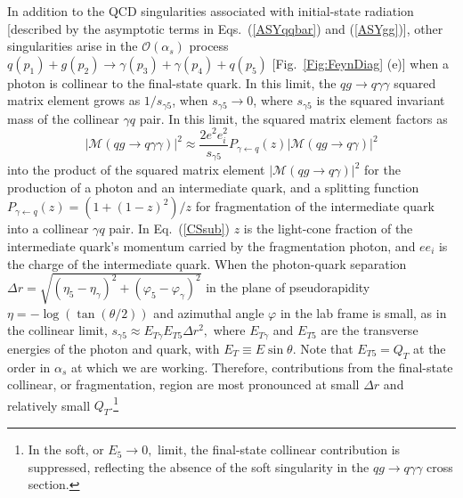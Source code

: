 \documentclass[12pt,english,aps,preprint,prd,letterpaper,fleqn,nofootinbib,showpacs,showkeys,tightenlines,floatfix]{revtex4}
\begin{document}
In addition to the QCD singularities associated with initial-state
radiation {[}described by the asymptotic terms in Eqs.~(\ref{ASYqqbar})
and (\ref{ASYgg})], other singularities arise in the ${\mathcal{O}}(\alpha_{s})$
process $q(p_{1})+g(p_{2})\rightarrow\gamma(p_{3})+\gamma(p_{4})+q(p_{5})$
{[}Fig.~\ref{Fig:FeynDiag} (e)] when a photon is collinear to the
final-state quark. In this limit, the $qg\rightarrow q\gamma\gamma$
squared matrix element grows as $1/s_{\gamma5}$, when $s_{\gamma5} \rightarrow 0$, 
where $s_{\gamma5}$ is the squared invariant mass of the collinear $\gamma q$
pair. In this limit, the squared matrix element factors as \begin{equation}
|{\mathcal{M}}(qg\rightarrow q\gamma\gamma)|^{2}\approx{\frac{2e^{2}e_{i}^{2}}{s_{\gamma5}}}P_{\gamma\leftarrow q}({z})|{\mathcal{M}}(qg\rightarrow q\gamma)|^{2}\label{CSsub}\end{equation}
 into the product of the squared matrix element $\left|{\mathcal{M}}(qg\rightarrow q\gamma)\right|^{2}$
for the production of a photon and an intermediate quark, and a splitting
function $P_{\gamma\leftarrow q}(z)=(1+(1-z)^{2})/z$ for fragmentation
of the intermediate quark into a collinear $\gamma q$ pair. In Eq.~(\ref{CSsub})
$z$ is the light-cone fraction of the intermediate quark's momentum
carried by the fragmentation photon, and $ee_{i}$ is the charge of
the intermediate quark. When the photon-quark separation $\Delta r=\sqrt{(\eta_{5}-\eta_{\gamma})^{2}+(\varphi_{5}-\varphi_{\gamma})^{2}}$
in the plane of pseudorapidity $\eta=-\log(\tan(\theta/2))$ and azimuthal
angle $\varphi$ in the lab frame is small, as in the collinear limit,
$s_{\gamma5}\approx E_{T\gamma}E_{T5}\Delta r^{2},$ where $E_{T\gamma}$
and $E_{T5}$ are the transverse energies of the photon and quark,
with $E_{T}\equiv E\sin\theta$. Note that $E_{T5}=Q_{T}$ at the
order in $\alpha_{s}$ at which we are working. Therefore, contributions
from the final-state collinear, or fragmentation, region
are most pronounced at small $\Delta r$ and relatively small $Q_{T}.$\footnote{In the soft, or $E_{5}\rightarrow0,$ limit, the final-state collinear
contribution is suppressed, reflecting the absence of the soft singularity
in the $qg\rightarrow q\gamma\gamma$ cross section. }
\end{document}

